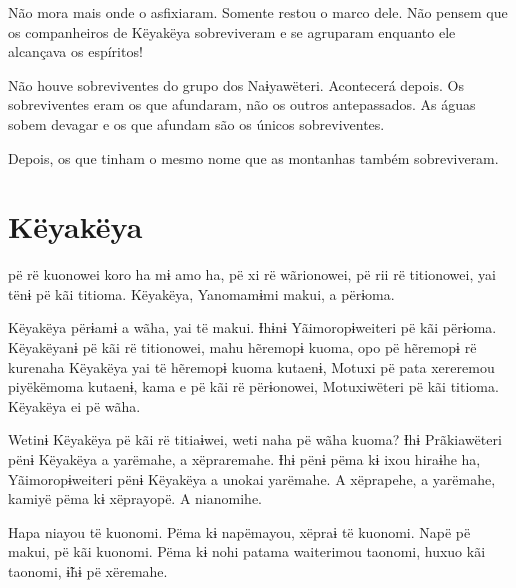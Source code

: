 
Não mora mais onde o asfixiaram. Somente restou o marco dele. Não pensem
que os companheiros de Këyakëya sobreviveram e se agruparam enquanto ele
alcançava os espíritos! 

Não houve sobreviventes do grupo dos Naɨyawëteri. Acontecerá depois. Os
sobreviventes eram os que afundaram, não os outros antepassados. As
águas sobem devagar e os que afundam são os únicos sobreviventes. 

\enlargethispage{1\baselineskip}

Depois, os que tinham o mesmo nome que as montanhas também
sobreviveram.

\chapter{Këyakëya}

 pë rë kuonowei koro ha mɨ amo ha, pë xi rë wãrionowei, pë rii rë
titionowei, yai tënɨ pë kãi titioma. Këyakëya, Yanomamɨmi makui, a
përɨoma. 


Këyakëya përɨamɨ a wãha, yai të makui. Ɨhɨnɨ Yãimoropɨweiteri pë kãi
përɨoma. Këyakëyanɨ pë kãi rë titionowei, mahu hẽremopɨ kuoma, opo pë
hẽremopɨ rë kurenaha Këyakëya yai të hẽremopɨ kuoma kutaenɨ, Motuxi pë
pata xereremou piyëkëmoma kutaenɨ, kama e pë kãi rë përɨonowei,
Motuxiwëteri pë kãi titioma. Këyakëya ei pë wãha. 

Wetinɨ Këyakëya pë kãi rë titiaɨwei, weti naha pë wãha kuoma? Ɨhɨ
Prãkiawëteri pënɨ Këyakëya a yarëmahe, a xëpraremahe. Ɨhɨ pënɨ pëma kɨ
ixou hiraɨhe ha, Yãimoropɨweiteri pënɨ Këyakëya a unokai yarëmahe. A xëprapehe, a yarëmahe, kamiyë pëma kɨ xëprayopë. A nianomihe. 

Hapa niayou të kuonomi. Pëma kɨ napëmayou, xëpraɨ të kuonomi. Napë pë
makui, pë kãi kuonomi. Pëma kɨ nohi patama waiterimou taonomi, huxuo kãi
taonomi, ɨ̃hɨ pë xëremahe. 


